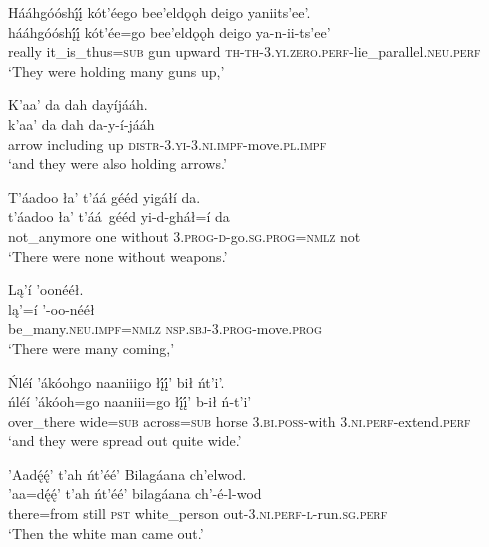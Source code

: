 \ea\label{ex:text1-65-15}
Hááhgóóshį́į́ kót’éego bee’eldǫǫh deigo yaniits’ee’.\\
\gll hááhgóóshį́į́	kót’ée=go	bee’eldǫǫh	deigo	ya-n-ii-ts’ee’\\
     really	it\_is\_thus=\textsc{sub}	gun	upward	\textsc{th}-\textsc{th}-3.\textsc{yi}.\textsc{zero}.\textsc{perf}-lie\_parallel.\textsc{neu}.\textsc{perf}\\
\glt `They were holding many guns up,'
\z

\ea\label{ex:text1-65-16}
K’aa’ da dah dayíjááh.\\
\gll k’aa’	da	dah	da-y-í-jááh\\
     arrow	including	up	\textsc{distr}-3.\textsc{yi}-3.\textsc{ni}.\textsc{impf}-move.\textsc{pl}.\textsc{impf}\\
\glt `and they were also holding arrows.'
\z

\ea\label{ex:text1-65-17}
T’áadoo ła’ t’áá gééd yigáłí da.\\
\gll t’áadoo	ła’	t’áá~{gééd}	yi-d-gháł=í	da\\
     not\_anymore	one	without	3.\textsc{prog}-\textsc{d}-go.\textsc{sg}.\textsc{prog}=\textsc{nmlz}	not\\
\glt `There were none without weapons.'
\z

\ea\label{ex:text1-65-18}
Lą’í ’oonééł.\\
\gll lą’=í	’-oo-nééł\\
     be\_many.\textsc{neu}.\textsc{impf}=\textsc{nmlz}	\textsc{nsp}.\textsc{sbj}-3.\textsc{prog}-move.\textsc{prog}\\
\glt `There were many coming,'
\z

\ea\label{ex:text1-65-19}
Ńléí ’ákóohgo naaniiigo łį́į́’ bił ńt’i’.\\
\gll ńléí	’ákóoh=go	naaniii=go	łį́į́’	b-ił	ń-t’i’\\
     over\_there	wide=\textsc{sub}	across=\textsc{sub}	horse	3.\textsc{bi}.\textsc{poss}-with	3.\textsc{ni}.\textsc{perf}-extend.\textsc{perf}\\
\glt `and they were spread out quite wide.'
\z

\ea\label{ex:text1-66-1}
’Aadę́ę́’ t’ah ńt’éé’ Bilagáana ch’elwod.\\
\gll ’aa=dę́ę́’	t’ah	ńt’éé’	bilagáana	ch’-é-l-wod\\
     there=from	still	\textsc{pst}	white\_person	out-3.\textsc{ni}.\textsc{perf}-\textsc{l}-run.\textsc{sg}.\textsc{perf}\\
\glt `Then the white man came out.'
\z


